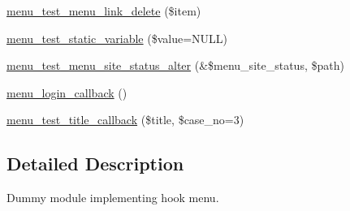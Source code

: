 \begin{DoxyCompactItemize}
\item 
\hyperlink{menu__test_8module_a823b79bcf475ef99b7d69cd5627bbe5a}{menu\_\-test\_\-menu\_\-link\_\-delete} (\$item)
\item 
\hyperlink{menu__test_8module_ac3620753f727728cc1802abc469ee491}{menu\_\-test\_\-static\_\-variable} (\$value=NULL)
\item 
\hyperlink{menu__test_8module_af13558b9100667f8f343fe0c2b87217b}{menu\_\-test\_\-menu\_\-site\_\-status\_\-alter} (\&\$menu\_\-site\_\-status, \$path)
\item 
\hyperlink{menu__test_8module_a74184541e43d378aa431a03383d6544d}{menu\_\-login\_\-callback} ()
\item 
\hyperlink{menu__test_8module_aba499d6eb2bae0d26c29b18d498ac79c}{menu\_\-test\_\-title\_\-callback} (\$title, \$case\_\-no=3)
\end{DoxyCompactItemize}


\subsection{Detailed Description}
Dummy module implementing hook menu. 

